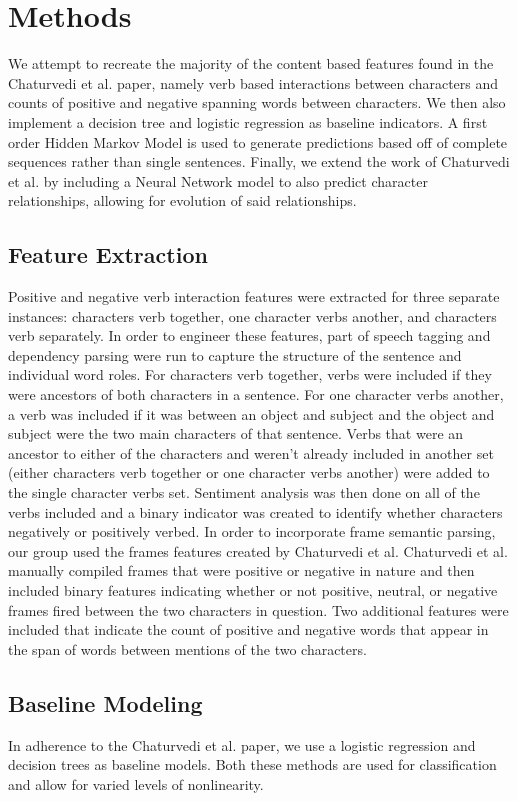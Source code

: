 \documentclass[11pt,a4paper]{article}
\begin{document}
\section{Methods}
We attempt to recreate the majority of the content based features found in the Chaturvedi et al. paper, namely verb based interactions between characters and counts of positive and negative spanning words between characters. We then also implement a decision tree and logistic regression as baseline indicators. A first order Hidden Markov Model is used to generate predictions based off of complete sequences rather than single sentences. Finally, we extend the work of Chaturvedi et al. by including a Neural Network model to also predict character relationships, allowing for evolution of said relationships.

\subsection{Feature Extraction}
Positive and negative verb interaction features were extracted for three separate instances: characters verb together, one character verbs another, and characters verb separately. In order to engineer these features, part of speech tagging and dependency parsing were run to capture the structure of the sentence and individual word roles. For characters verb together, verbs were included if they were ancestors of both characters in a sentence. For one character verbs another, a verb was included if it was between an object and subject and the object and subject were the two main characters of that sentence. Verbs that were an ancestor to either of the characters and weren't already included in another set (either characters verb together or one character verbs another) were added to the single character verbs set. Sentiment analysis was then done on all of the verbs included and a binary indicator was created to identify whether characters negatively or positively verbed. 
In order to incorporate frame semantic parsing, our group used the frames features created by Chaturvedi et al. Chaturvedi et al. manually compiled frames that were positive or negative in nature and then included binary features indicating whether or not positive, neutral, or negative frames fired between the two characters in question.
Two additional features were included that indicate the count of positive and negative words that appear in the span of words between mentions of the two characters.

\subsection{Baseline Modeling}
In adherence to the Chaturvedi et al. paper, we use a logistic regression and decision trees as baseline models. Both these methods are used for classification and allow for varied levels of nonlinearity. 
\end{document}
